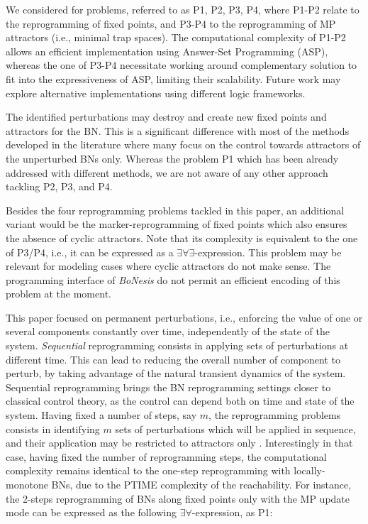 \documentclass[PCJ,Unicode,screen,mode=plain]{cedram}
\begin{document}
We considered for problems, referred to as P1, P2, P3, P4, where P1-P2
relate to the reprogramming of fixed points, and P3-P4 to the
reprogramming of MP attractors (i.e., minimal trap spaces). The
computational complexity of P1-P2 allows an efficient implementation
using Answer-Set Programming (ASP), whereas the one of P3-P4 necessitate
working around complementary solution to fit into the expressiveness of
ASP, limiting their scalability. Future work may explore alternative
implementations using different logic frameworks.

The identified perturbations may destroy and create new fixed points and
attractors for the BN. This is a significant difference with most of the
methods developed in the literature where many focus on the control
towards attractors of the unperturbed BNs only. Whereas the problem P1
which has been already addressed with different methods, we are not
aware of any other approach tackling P2, P3, and P4.

Besides the four reprogramming problems tackled in this paper, an
additional variant would be the marker-reprogramming of fixed points
which also ensures the absence of cyclic attractors. Note that its
complexity is equivalent to the one of P3/P4, i.e., it can be expressed
as a \(\exists\forall\exists\)-expression. This problem may be relevant
for modeling cases where cyclic attractors do not make sense. The
programming interface of \emph{BoNesis} do not permit an efficient
encoding of this problem at the moment.

This paper focused on permanent perturbations, i.e., enforcing the value
of one or several components constantly over time, independently of the
state of the system. \emph{Sequential} reprogramming
\citep{Mandon2017,Pardo2021} consists in applying sets of perturbations
at different time. This can lead to reducing the overall number of
component to perturb, by taking advantage of the natural transient
dynamics of the system. Sequential reprogramming brings the BN
reprogramming settings closer to classical control theory, as the
control can depend both on time and state of the system. Having fixed a
number of steps, say \(m\), the reprogramming problems consists in
identifying \(m\) sets of perturbations which will be applied in
sequence, and their application may be restricted to attractors only
\citep{Mandon2019}. Interestingly in that case, having fixed the number
of reprogramming steps, the computational complexity remains identical
to the one-step reprogramming with locally-monotone BNs, due to the
PTIME complexity of the reachability. For instance, the 2-steps
reprogramming of BNs along fixed points only with the MP update mode can
be expressed as the following \(\exists\forall\)-expression, as P1:
\end{document}
